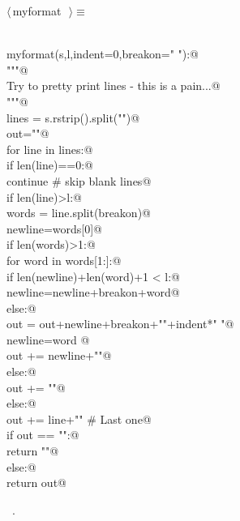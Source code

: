 \documentclass[10pt,a4paper,twoside,notitlepage]{article}
\begin{document}
\begin{flushleft} \small
\begin{minipage}{\linewidth} \label{scrap7}
$\langle\,$myformat\nobreak\ {\footnotesize {}}$\,\rangle\equiv$
\vspace{-1ex}
\begin{list}{}{} \item
\mbox{}\verb@@\\
\mbox{}\verb@def myformat(s,l,indent=0,breakon=" "):@\\
\mbox{}\verb@   """@\\
\mbox{}\verb@   Try to pretty print lines - this is a pain...@\\
\mbox{}\verb@   """@\\
\mbox{}\verb@   lines = s.rstrip().split("\n")@\\
\mbox{}\verb@   out=""@\\
\mbox{}\verb@   for line in lines:@\\
\mbox{}\verb@      if len(line)==0:@\\
\mbox{}\verb@         continue # skip blank lines@\\
\mbox{}\verb@      if len(line)>l:@\\
\mbox{}\verb@         words = line.split(breakon)@\\
\mbox{}\verb@         newline=words[0]@\\
\mbox{}\verb@         if len(words)>1:@\\
\mbox{}\verb@            for word in words[1:]:@\\
\mbox{}\verb@               if len(newline)+len(word)+1 < l:@\\
\mbox{}\verb@                  newline=newline+breakon+word@\\
\mbox{}\verb@               else:@\\
\mbox{}\verb@                  out = out+newline+breakon+"\n"+indent*" "@\\
\mbox{}\verb@                  newline=word       @\\
\mbox{}\verb@            out += newline+"\n"@\\
\mbox{}\verb@         else:@\\
\mbox{}\verb@            out += "\n"@\\
\mbox{}\verb@      else:@\\
\mbox{}\verb@         out += line+"\n" # Last one@\\
\mbox{}\verb@   if out == "":@\\
\mbox{}\verb@      return "\n"@\\
\mbox{}\verb@   else:@\\
\mbox{}\verb@      return out@\\
\mbox{}\verb@@{\NWsep}
\end{list}
\vspace{-1ex}
\footnotesize\addtolength{\baselineskip}{-1ex}
\begin{list}{}{\setlength{\itemsep}{-\parsep}\setlength{\itemindent}{-\leftmargin}}
\item \NWtxtMacroRefIn\ .
\end{list}
\end{minipage}\\[4ex]
\end{flushleft}
\end{document}
